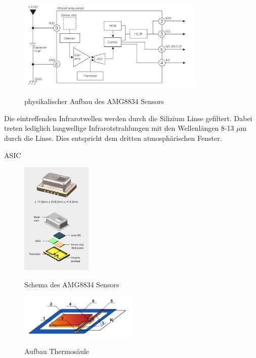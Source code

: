 \begin{figure}[H]
	\centering
	\includegraphics[width=0.8\textwidth]
	{fig/Circuit_AMG8834.PNG}
	\caption[physikalischer Aufbau AMG8834 Sensors]{physikalischer Aufbau des AMG8834 Sensors} \protect\cite{AMG8834}
	\label{fig:physAufbauAMG8834}
\end{figure}

Die eintreffenden Infrarotwellen werden durch die Silizium Linse gefiltert. Dabei treten lediglich langwellige  Infrarotstrahlungen mit den Wellenlängen 8-13 $\mu$m durch die Linse. Dies entspricht dem dritten atmosphärischen Fenster.


\ac{ASIC}

\begin{figure}[H]
	\centering
	\includegraphics[width=0.3\textwidth]
	{fig/grid_eye_aufbau.PNG}
	\caption[Schema des AMG8834 Sensors]{Schema des AMG8834 Sensors} \protect\cite{AMG8834}
	\label{fig:Explosionsdarstellung}
\end{figure}



\begin{figure}[H]
	\centering
	\includegraphics[width=0.5\textwidth]
	{fig/Mems_Thermopile.PNG}
	\caption[Aufbau Thermosäule]{Aufbau Thermosäule} \protect\cite{AMG8834}
	\label{fig:AufbauThermo}
\end{figure}



